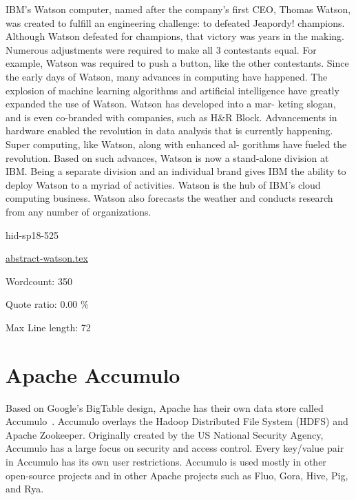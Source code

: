 IBM’s Watson computer, named after the company’s first CEO, Thomas
Watson, was created to fulfill an engineering challenge: to defeated
Jeapordy! champions\cite{hid-sp18-525-watson}. Although Watson defeated
for champions, that victory was years in the making.  Numerous
adjustments were required to make all 3 contestants equal.  For
example, Watson was required to push a button, like the other
contestants\cite{hid-sp18-525-watson}. Since the early days of Watson,
many advances in computing have happened. The explosion of machine
learning algorithms and artificial intelligence have greatly expanded
the use of Watson. Watson has developed into a mar- keting slogan, and
is even co-branded with companies, such as H\&R
Block\cite{hid-sp18-525-watson}. Advancements in hardware enabled the
revolution in data analysis that is currently happening. Super
computing, like Watson, along with enhanced al- gorithms have fueled
the revolution. Based on such advances, Watson is now a stand-alone
division at IBM\cite{hid-sp18-525-watson}. Being a separate division and
an individual brand gives IBM the ability to deploy Watson to a myriad
of activities. Watson is the hub of IBM’s cloud computing business.
Watson also forecasts the weather and conducts research from any
number of organizations\cite{hid-sp18-525-watson}.



\begin{IU}

hid-sp18-525

\href{https://github.com/cloudmesh-community/hid-sp18-525/blob/master//technology/abstract-watson.tex}{abstract-watson.tex}

 

Wordcount: 350


Quote ratio: 0.00 \%
 
Max Line length: 72
\end{IU}

\section{Apache Accumulo}

Based on Google's BigTable design, Apache has their own
data store called Accumulo~\cite{hid-sp18-526-www-apache-accumulo}.
Accumulo overlays the Hadoop Distributed File System (HDFS) and
Apache Zookeeper. Originally created by the US National Security
Agency, Accumulo has a large focus on security and access control. 
Every key/value pair in Accumulo has its own user restrictions. 
Accumulo is used mostly in other open-source projects and in other 
Apache projects such as Fluo, Gora, Hive, Pig, and Rya.



